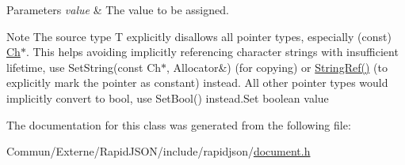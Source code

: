 \begin{DoxyParams}{Parameters}
{\em value} & The value to be assigned.\\
\hline
\end{DoxyParams}
\begin{DoxyNote}{Note}
The source type {\ttfamily T} explicitly disallows all pointer types, especially ({\ttfamily const}) \hyperlink{class_generic_value_ade0e0ce64ccd5d852da57a35e720bafb}{Ch}$\ast$. This helps avoiding implicitly referencing character strings with insufficient lifetime, use Set\+String(const Ch$\ast$, Allocator\&) (for copying) or \hyperlink{document_8h_aa6b9fd9f6aa49405a574c362ba9af6b5}{String\+Ref()} (to explicitly mark the pointer as constant) instead. All other pointer types would implicitly convert to {\ttfamily bool}, use Set\+Bool() instead.\+Set boolean value 
\end{DoxyNote}


The documentation for this class was generated from the following file\+:\begin{DoxyCompactItemize}
\item 
Commun/\+Externe/\+Rapid\+J\+S\+O\+N/include/rapidjson/\hyperlink{document_8h}{document.\+h}\end{DoxyCompactItemize}
